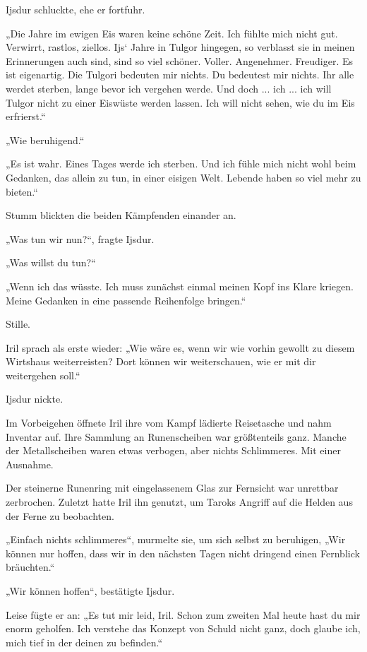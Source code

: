 Ijsdur schluckte, ehe er fortfuhr.

„Die Jahre im ewigen Eis waren keine schöne Zeit. Ich fühlte mich nicht gut. Verwirrt, rastlos, ziellos. Ijs‘ Jahre in Tulgor hingegen, so verblasst sie in meinen Erinnerungen auch sind, sind so viel schöner. Voller. Angenehmer. Freudiger. Es ist eigenartig. Die Tulgori bedeuten mir nichts. Du bedeutest mir nichts. Ihr alle werdet sterben, lange bevor ich vergehen werde. Und doch ... ich ... ich will Tulgor nicht zu einer Eiswüste werden lassen. Ich will nicht sehen, wie du im Eis erfrierst.“

„Wie beruhigend.“

„Es ist wahr. Eines Tages werde ich sterben. Und ich fühle mich nicht wohl beim Gedanken, das allein zu tun, in einer eisigen Welt. Lebende haben so viel mehr zu bieten.“

Stumm blickten die beiden Kämpfenden einander an.

„Was tun wir nun?“, fragte Ijsdur.

„Was willst du tun?“

„Wenn ich das wüsste. Ich muss zunächst einmal meinen Kopf ins Klare kriegen. Meine Gedanken in eine passende Reihenfolge bringen.“

Stille.

Iril sprach als erste wieder: „Wie wäre es, wenn wir wie vorhin gewollt zu diesem Wirtshaus weiterreisten? Dort können wir weiterschauen, wie er mit dir weitergehen soll.“

Ijsdur nickte.\bigskip







Im Vorbeigehen öffnete Iril ihre vom Kampf lädierte Reisetasche und nahm Inventar auf. Ihre Sammlung an Runenscheiben war größtenteils ganz. Manche der Metallscheiben waren etwas verbogen, aber nichts Schlimmeres. Mit einer Ausnahme.

Der steinerne Runenring mit eingelassenem Glas zur Fernsicht war unrettbar zerbrochen. Zuletzt hatte Iril ihn genutzt, um Taroks Angriff auf die Helden aus der Ferne zu beobachten.

„Einfach nichts schlimmeres“, murmelte sie, um sich selbst zu beruhigen, „Wir können nur hoffen, dass wir in den nächsten Tagen nicht dringend einen Fernblick bräuchten.“

„Wir können hoffen“, bestätigte Ijsdur.

Leise fügte er an: „Es tut mir leid, Iril. Schon zum zweiten Mal heute hast du mir enorm geholfen. Ich verstehe das Konzept von Schuld nicht ganz, doch glaube ich, mich tief in der deinen zu befinden.“

